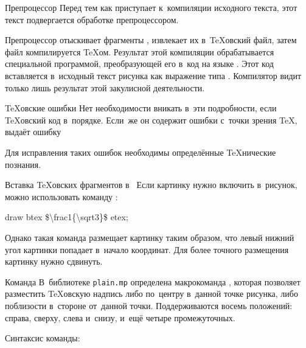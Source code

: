 \begin{frame}{Препроцессор}
Перед тем как  приступает к~компиляции исходного текста, этот
текст подвергается обработке препроцессором.

Препроцессор отыскивает фрагменты , извлекает их
в~\TeX{}овский файл, затем файл компилируется \TeX{}ом. Результат этой
компиляции обрабатывается специальной программой, преобразующей его в~код на
языке . Этот код вставляется в~исходный текст рисунка как
выражение типа . Компилятор  видит только
лишь результат этой закулисной деятельности.
\end{frame}

\begin{frame}{\TeX{}овские ошибки}
Нет необходимости вникать в~эти подробности, если \TeX{}овский код в~порядке.
Если~же он содержит ошибки с~точки зрения \TeX,  выдаёт ошибку
\begin{screen}
%
%
\end{screen}
Для исправления таких ошибок необходимы определённые \TeX{}нические познания.
\end{frame}

\begin{frame}{Вставка \TeX{}овских фрагментов в~}
Если картинку  нужно включить в~рисунок, можно
использовать команду :
\begin{programlisting}
draw btex \$\textbackslash frac1\{\textbackslash sqrt3\}\$ etex;
\end{programlisting}

Однако такая команда размещает картинку таким образом, что левый нижний угол
картинки попадает в~начало координат. Для более точного размещения картинку
нужно сдвинуть.
\end{frame}

\begin{frame}{Команда }
В~библиотеке \nolinkurl{plain.mp} определена макрокоманда ,
которая позволяет разместить \TeX{}овскую надпись либо по~центру в~данной точке
рисунка, либо поблизости в~стороне от~данной точки. Поддерживаются восемь
положений: справа, сверху, слева и~снизу, и~ещё четыре промежуточных.

Синтаксис команды:
\begin{center}
\Large
{}\literal{,~}\literal{)}
\literal{(}\literal{, }\literal{)}
\end{center}
\end{frame}

